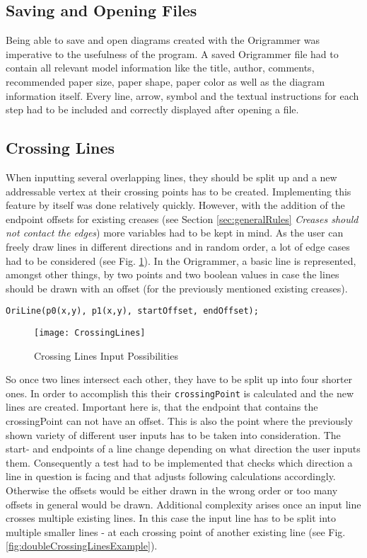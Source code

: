 \subsection{Saving and Opening Files}

Being able to save and open diagrams created with the Origrammer was imperative to the usefulness of the program. A saved Origrammer file had to contain all relevant model information like the title, author, comments, recommended paper size, paper shape, paper color as well as the diagram information itself. Every line, arrow, symbol and the textual instructions for each step had to be included and correctly displayed after opening a file.


\subsection{Crossing Lines}

When inputting several overlapping lines, they should be split up and a new addressable vertex at their crossing points has to be created. Implementing this feature by itself was done relatively quickly. However, with the addition of the endpoint offsets for existing creases (see Section \ref{sec:generalRules} \emph{Creases should not contact the edges}) more variables had to be kept in mind. As the user can freely draw lines in different directions and in random order, a lot of edge cases had to be considered (see Fig. \ref{fig:crossingLines}). In the Origrammer, a basic line is represented, amongst other things,  by two points and two boolean values in case the lines should be drawn with an offset (for the previously mentioned existing creases).

\begin{center}
\noindent\texttt{OriLine(p0(x,y), p1(x,y),  startOffset, endOffset);}
\end{center}
\begin{figure}[htbp]
	\centering
	\texttt{[image: CrossingLines]}
	\caption{Crossing Lines Input Possibilities}
	\label{fig:crossingLines}
\end{figure}
So once two lines intersect each other, they have to be split up into four shorter ones. In order to accomplish this their \texttt{crossingPoint} is calculated and the new lines are created. Important here is, that the endpoint that contains the crossingPoint can not have an offset. This is also the point where the previously shown variety of different user inputs has to be taken into consideration. The start- and endpoints of a line change depending on what direction the user inputs them. Consequently a test had to be implemented that checks which direction a line in question is facing and that adjusts following calculations accordingly. Otherwise the offsets would be either drawn in the wrong order or too many offsets in general would be drawn. Additional complexity arises once an input line crosses multiple existing lines. In this case the input line has to be split into multiple smaller lines - at each crossing point of another existing line (see Fig. \ref{fig:doubleCrossingLinesExample}).

